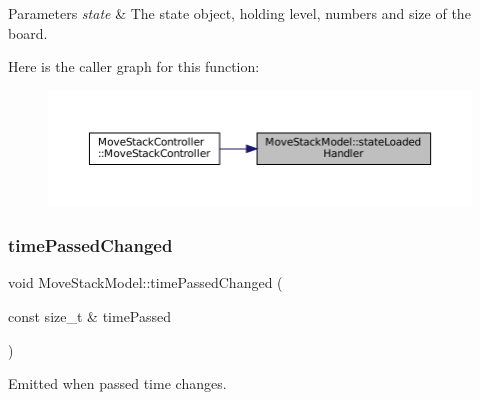 \begin{DoxyParams}{Parameters}
{\em state} & The state object, holding level, numbers and size of the board. \\
\hline
\end{DoxyParams}
Here is the caller graph for this function\+:
\nopagebreak
\begin{figure}[H]
\begin{center}
\leavevmode
\includegraphics[width=350pt]{class_move_stack_model_a2c8028466c62b5f8b269b71939c56ef8_icgraph}
\end{center}
\end{figure}
\mbox{\label{class_move_stack_model_aa7d3186093032e523b2a7bbefa74f8fb}} 
\subsubsection{\texorpdfstring{timePassedChanged}{timePassedChanged}}
{\footnotesize\ttfamily void Move\+Stack\+Model\+::time\+Passed\+Changed (\begin{DoxyParamCaption}\item[{const size\+\_\+t \&}]{time\+Passed }\end{DoxyParamCaption})\hspace{0.3cm}{\ttfamily [signal]}}



Emitted when passed time changes. 



